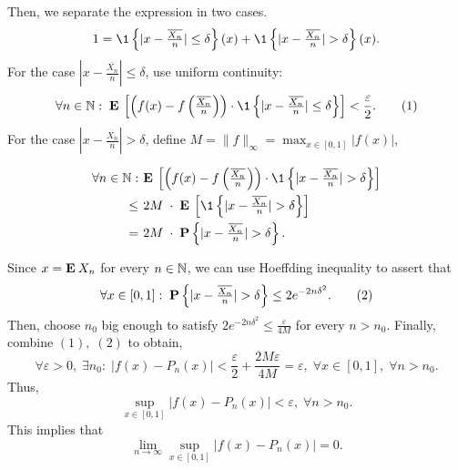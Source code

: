 Then, we separate the expression in two cases.
\[ 1 = \1\left\{ |x-\tfrac{\overline{X_n}}{n}| \leq \delta \right\}(x) + \1\left\{ |x-\tfrac{\overline{X_n}}{n}| > \delta \right\}(x). \]
For the case $ |x-\tfrac{\overline{X_n}}{n}| \leq \delta $, use uniform continuity:
\[ \forall n\in \N: \;\E \left[ \left( f(x) - f\left( \tfrac{\overline{X_n}}{n} \right) \right) \cdot \1\left\{ |x-\tfrac{\overline{X_n}}{n}|\leq \delta \right\} \right] < \frac{\varepsilon}{2}. \tag{1}\]
For the case $ |x-\tfrac{\overline{X_n}}{n}| > \delta $, define $M = \|f\|_\infty = \max_{x\in [0,1]} |f(x)|$,
\[ \everymath{\displaystyle}
\arraycolsep=1.8pt\def\arraystretch{1.8}
\begin{array}{rl}
    \forall n\in \N: 
    & \E \left[ \left( f(x) - f\left( \tfrac{\overline{X_n}}{n} \right) \right) \cdot \1\left\{ |x-\tfrac{\overline{X_n}}{n}|> \delta \right\} \right]\\
    \leq & 2M \; \cdot \; \E\left[ \1\left\{ |x-\tfrac{\overline{X_n}}{n}|> \delta \right\} \right]\\
    = & 2M  \; \cdot \; \P \left\{ |x-\tfrac{\overline{X_n}}{n}|> \delta \right\}.
\end{array}\]

Since $x = \mathbf{E}\: X_n$ for every $n\in\mathbb{N}$, we can use Hoeffding inequality to assert that
\[\forall x\in [0,1]:\; \P \left\{ |x-\tfrac{\overline{X_n}}{n}|> \delta \right\} \leq 2 e^{-2n\delta^2}. \tag{2} \]
Then, choose $n_0$ big enough to satisfy $ 2 e^{-2n\delta^2} \leq \frac{\varepsilon}{4M} $ for every $n > n_0$. Finally, combine $(1),\;(2)$ to obtain,
\[ \forall \varepsilon > 0,\; \exists n_0:\; |f(x) - P_n(x)| < \frac{\varepsilon}{2} + \frac{2M\varepsilon}{4M} = \varepsilon,\; \forall x\in[0,1],\; \forall n > n_0. \]
Thus,
\[ \sup_{x\in[0,1]}|f(x) - P_n(x)| < \varepsilon,\; \forall n>n_0. \]
This implies that
\[ \lim_{n\to \infty} \sup_{x\in[0,1]}|f(x) - P_n(x)| = 0. \]